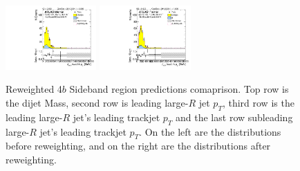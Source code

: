 \begin{figure}[htbp!]
\begin{center}
\includegraphics[angle=270, width=0.31\textwidth]{./figures/boosted/Prereweight/Moriond_FourTag_Sideband_sublHCand_trk0_Pt.pdf}
\includegraphics[angle=270, width=0.31\textwidth]{./figures/boosted/Sideband/b77_FourTag_Sideband_sublHCand_trk0_Pt.pdf}\\
\caption{Reweighted 4$b$ Sideband region predictions comaprison. Top row is the dijet Mass, second row is leading large-$R$ jet $p_{T}$, third row is the leading large-$R$ jet's leading trackjet $p_T$ and the last row subleading large-$R$ jet's leading trackjet $p_T$. On the left are the distributions before reweighting, and on the right are the distributions after reweighting.}
\label{fig:rw-4b-comp-sb}
\end{center}
\end{figure}



